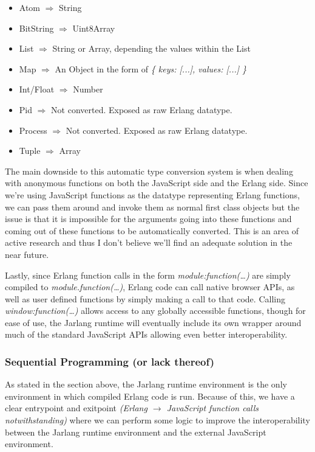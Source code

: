 \documentclass[twoside,12pt,titlepage,a4paper]{article}
\begin{document}
\begin{itemize}
\item Atom $\Rightarrow$ String
\item BitString $\Rightarrow$ Uint8Array
\item List $\Rightarrow$ String or Array, depending the values within the List
\item Map $\Rightarrow$ An Object in the form of \textit{\{ keys: [...], values: [...] \}}
\item Int/Float $\Rightarrow$ Number
\item Pid $\Rightarrow$ Not converted. Exposed as raw Erlang datatype.
\item Process $\Rightarrow$ Not converted. Exposed as raw Erlang datatype.
\item Tuple $\Rightarrow$ Array
\end{itemize}

The main downside to this automatic type conversion system is when dealing with anonymous functions on both the JavaScript side and the Erlang side. Since we're using JavaScript functions as the datatype representing Erlang functions, we can pass them around and invoke them as normal first class objects but the issue is that it is impossible for the arguments going into these functions and coming out of these functions to be automatically converted. This is an area of active research and thus I don't believe we'll find an adequate solution in the near future.

Lastly, since Erlang function calls in the form \textit{module:function(\dots)} are simply compiled to \textit{module.function(\dots)}, Erlang code can call native browser APIs, as well as user defined functions by simply making a call to that code. Calling \textit{window:function(\dots)} allows access to any globally accessible functions, though for ease of use, the Jarlang runtime will eventually include its own wrapper around much of the standard JavaScript APIs allowing even better interoperability.

\subsubsection{Sequential Programming (or lack thereof)}
As stated in the section above, the Jarlang runtime environment is the only environment in which compiled Erlang code is run. Because of this, we have a clear entrypoint and exitpoint \textit{(Erlang $\rightarrow$ JavaScript function calls notwithstanding)} where we can perform some logic to improve the interoperability between the Jarlang runtime environment and the external JavaScript environment.
\end{document}
